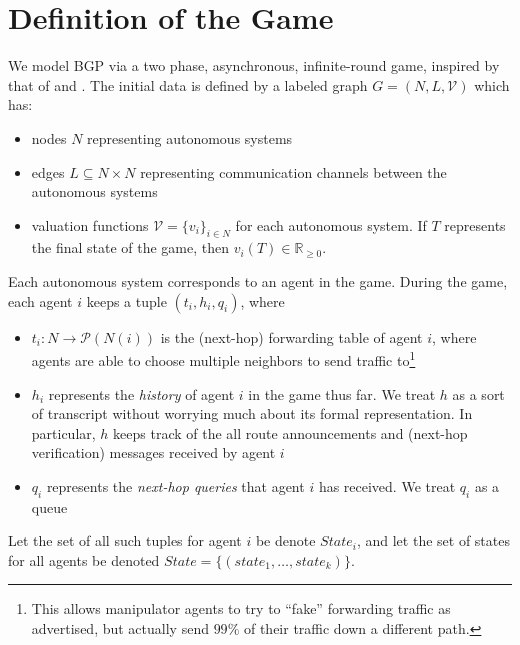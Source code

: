 \documentclass[12pt]{article}
\newcommand{\R}{\mathbb{R}}
\begin{document}
\section{Definition of the Game}
  We  model BGP via a two phase, asynchronous, infinite-round game,
  inspired by that of \cite{RoutingGames} and \cite{Attraction}.
  The initial data is defined by a labeled graph $G = (N,L,\mathcal V)$ which has:
  \begin{itemize}
    \item nodes $N$ representing autonomous systems
    \item edges $L \subseteq N\times N$ representing communication channels
      between the autonomous systems
    \item valuation functions $\mathcal V = \{v_i\}_{i\in N}$ for each 
      autonomous system. If $T$ represents the final state of the game,
      then $v_i(T) \in \R_{\ge 0}$.
  \end{itemize}
  Each autonomous system corresponds to an agent in the game.
  During the game, each agent $i$ keeps a tuple $(t_i, h_i, q_i)$, where
  \begin{itemize}
    \item $t_i : N \to \mathcal P (N(i))$ is the (next-hop)
      forwarding table of agent $i$, where agents are able to choose multiple
      neighbors to send traffic to\footnote{
        This allows manipulator agents to try to ``fake'' forwarding traffic
        as advertised, but actually send $99\%$ of their traffic down a different
        path.
      }
    \item $h_i$ represents the \emph{history} of agent $i$ in the game thus far.
      We treat $h$ as a sort of transcript without worrying much about its
      formal representation. In particular, $h$ keeps track of the all
      route announcements and (next-hop verification) messages received by
      agent $i$
    \item $q_i$ represents the \emph{next-hop queries} that agent $i$ has
      received. We treat $q_i$ as a queue
  \end{itemize}
  Let the set of all such tuples for agent $i$ be denote $State_i$,
  and let the set of states for all agents be denoted
  $State = \{(state_1,\ldots, state_k)\}$.
\end{document}
